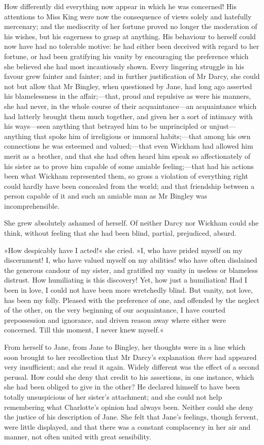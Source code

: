 How differently did everything now appear in which he was concerned! His attentions to Miss King were now the consequence of views solely and hatefully mercenary; and the mediocrity of her fortune proved no longer the moderation of his wishes, but his eagerness to grasp at anything. His behaviour to herself could now have had no tolerable motive: he had either been deceived with regard to her fortune, or had been gratifying his vanity by encouraging the preference which she believed she had most incautiously shown. Every lingering struggle in his favour grew fainter and fainter; and in further justification of Mr Darcy, she could not but allow that Mr Bingley, when questioned by Jane, had long ago asserted his blamelessness in the affair;—that, proud and repulsive as were his manners, she had never, in the whole course of their acquaintance—an acquaintance which had latterly brought them much together, and given her a sort of intimacy with his ways—seen anything that betrayed him to be unprincipled or unjust—anything that spoke him of irreligious or immoral habits;—that among his own connections he was esteemed and valued;—that even Wickham had allowed him merit as a brother, and that she had often heard him speak so affectionately of his sister as to prove him capable of some amiable feeling;—that had his actions been what Wickham represented them, so gross a violation of everything right could hardly have been concealed from the world; and that friendship between a person capable of it and such an amiable man as Mr Bingley was incomprehensible.

She grew absolutely ashamed of herself. Of neither Darcy nor Wickham could she think, without feeling that she had been blind, partial, prejudiced, absurd.

»How despicably have I acted!« she cried. »I, who have prided myself on my discernment! I, who have valued myself on my abilities! who have often disdained the generous candour of my sister, and gratified my vanity in useless or blameless distrust. How humiliating is this discovery! Yet, how just a humiliation! Had I been in love, I could not have been more wretchedly blind. But vanity, not love, has been my folly. Pleased with the preference of one, and offended by the neglect of the other, on the very beginning of our acquaintance, I have courted prepossession and ignorance, and driven reason away where either were concerned. Till this moment, I never knew myself.«

From herself to Jane, from Jane to Bingley, her thoughts were in a line which soon brought to her recollection that Mr Darcy's explanation \textit{there} had appeared very insufficient; and she read it again. Widely different was the effect of a second perusal. How could she deny that credit to his assertions, in one instance, which she had been obliged to give in the other? He declared himself to have been totally unsuspicious of her sister's attachment; and she could not help remembering what Charlotte's opinion had always been. Neither could she deny the justice of his description of Jane. She felt that Jane's feelings, though fervent, were little displayed, and that there was a constant complacency in her air and manner, not often united with great sensibility.

